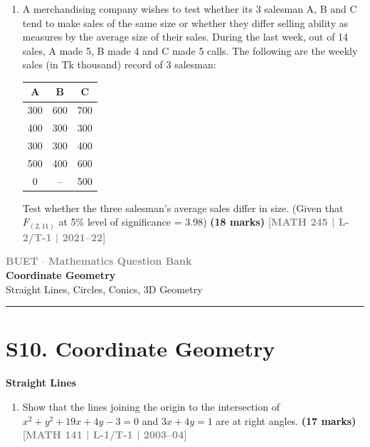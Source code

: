\documentclass[12pt,a4paper]{article}
\newcommand{\yr}[1]{\hfill\textcolor{gray}{\small\textbf{[#1]}}}
\newcommand{\mk}[1]{\textcolor{orange!70!black}{\small\textbf{(#1 marks)}}}
\newcommand{\subtopic}[2]{%
  \vspace{10pt}
  \noindent\begin{tcolorbox}[colback=#1!8,colframe=#1,boxrule=0.6pt,arc=4pt,
    left=6pt,right=6pt,top=4pt,bottom=4pt]
    \small\bfseries\textcolor{#1}{#2}
  \end{tcolorbox}
  \vspace{2pt}
}
\newcommand{\secdivider}[3]{%
  \newpage\thispagestyle{empty}%
  \vspace*{\fill}%
  \begin{tcolorbox}[enhanced,colback=#3!6,colframe=#3,boxrule=1.5pt,arc=8pt,
    left=20pt,right=20pt,top=22pt,bottom=22pt,
    shadow={3pt}{-3pt}{0pt}{black!15}]
    \centering
    {\large\textcolor{gray}{\textbf{BUET $\cdot$ Mathematics Question Bank}}}\\[8pt]
    {\fontsize{26}{32}\selectfont\bfseries\textcolor{#3}{#1}}\\[6pt]
    {\fontsize{15}{19}\selectfont\textcolor{dgray}{#2}}\\[12pt]
    \textcolor{#3!60}{\rule{0.5\textwidth}{0.5pt}}
  \end{tcolorbox}%
  \vspace*{\fill}\newpage%
}
\begin{document}
\begin{enumerate}

\item A merchandising company wishes to test whether its 3 salesman A, B and C tend to make sales of the same size or whether they differ selling ability as measures by the average size of their sales. During the last week, out of 14 sales, A made 5, B made 4 and C made 5 calls. The following are the weekly sales (in Tk thousand) record of 3 salesman:
\begin{center}
  \begin{tabular}{|c|c|c|}
\hline
A   & B   & C   \\ \hline
300 & 600 & 700 \\ \hline
400 & 300 & 300 \\ \hline
300 & 300 & 400 \\ \hline
500 & 400 & 600 \\ \hline
0   & --  & 500 \\ \hline
\end{tabular}
\end{center}

\vspace{0.2cm}

Test whether the three salesman's average sales differ in size. (Given that $F_{(2,11)}$ at 5\% level of significance = 3.98)
\mk{18} \yr{MATH 245 | L-2/T-1 | 2021--22}

\end{enumerate}


\secdivider{Coordinate Geometry}{Straight Lines, Circles, Conics, 3D Geometry}{cH}

\section{S10. Coordinate Geometry}
\label{sec:S10}

\subtopic{cH}{Straight Lines}
\label{sub:s10-lines}

\begin{enumerate}

\item Show that the lines joining the origin to the intersection of $x^{2}+y^{2}+19x+4y-3=0$ and $3x+4y=1$ are at right angles.
\mk{17} \yr{MATH 141 | L-1/T-1 | 2003--04}

\end{enumerate}
\end{document}
